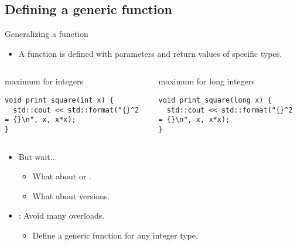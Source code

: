 \subsection{Defining a generic function}

\begin{frame}[t,fragile]{Generalizing a function}
\begin{itemize}
  \item A function is defined with parameters and return
        values of specific types.
\end{itemize}

\begin{columns}[T]

\begin{block}{maximum for integers}
\begin{lstlisting}
void print_square(int x) {
  std::cout << std::format("{}^2 = {}\n", x, x*x);
}
\end{lstlisting}
\end{block}

\begin{block}{maximum for long integers}
\begin{lstlisting}
void print_square(long x) {
  std::cout << std::format("{}^2 = {}\n", x, x*x);
}

\end{lstlisting}
\end{block}

\end{columns}

\begin{itemize}
  \item But wait...
    \begin{itemize}
      \item What about  or .
      \item What about  versions.
    \end{itemize}

  \item {}: Avoid many overloads.
    \begin{itemize}
      \item Define a generic function for any integer type.
    \end{itemize}
\end{itemize}

\end{frame}

